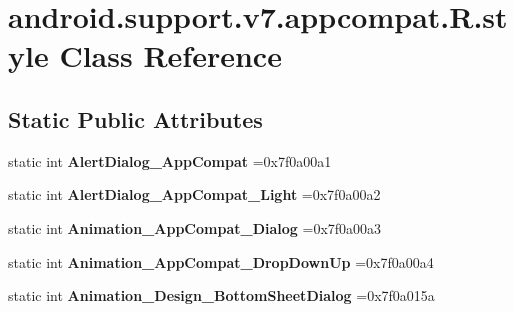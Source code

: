 \hypertarget{classandroid_1_1support_1_1v7_1_1appcompat_1_1R_1_1style}{}\section{android.\+support.\+v7.\+appcompat.\+R.\+style Class Reference}
\label{classandroid_1_1support_1_1v7_1_1appcompat_1_1R_1_1style}
\subsection*{Static Public Attributes}
\begin{DoxyCompactItemize}
\item 
\mbox{\label{classandroid_1_1support_1_1v7_1_1appcompat_1_1R_1_1style_a1d277ff6d4b5639026ccc57490357a09}} 
static int {\bfseries Alert\+Dialog\+\_\+\+App\+Compat} =0x7f0a00a1
\item 
\mbox{\label{classandroid_1_1support_1_1v7_1_1appcompat_1_1R_1_1style_ac9fa48815f83473e6bb18bd22d132c21}} 
static int {\bfseries Alert\+Dialog\+\_\+\+App\+Compat\+\_\+\+Light} =0x7f0a00a2
\item 
\mbox{\label{classandroid_1_1support_1_1v7_1_1appcompat_1_1R_1_1style_a05612d9149eecc92de88626d144d9f88}} 
static int {\bfseries Animation\+\_\+\+App\+Compat\+\_\+\+Dialog} =0x7f0a00a3
\item 
\mbox{\label{classandroid_1_1support_1_1v7_1_1appcompat_1_1R_1_1style_a959f92d2fbb0312a73faf16ab61eb1e3}} 
static int {\bfseries Animation\+\_\+\+App\+Compat\+\_\+\+Drop\+Down\+Up} =0x7f0a00a4
\item 
\mbox{\label{classandroid_1_1support_1_1v7_1_1appcompat_1_1R_1_1style_aa7c56d1be2a57cf17def7634976a2361}} 
static int {\bfseries Animation\+\_\+\+Design\+\_\+\+Bottom\+Sheet\+Dialog} =0x7f0a015a
\item 
\mbox{\label{classandroid_1_1support_1_1v7_1_1appcompat_1_1R_1_1style_aad04874c83703295e00b83aaa662d336}} 

\end{DoxyCompactItemize}
